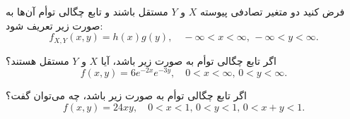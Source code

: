 \problem{}
فرض کنید دو متغیر تصادفی پیوسته $X$ و $Y$ مستقل باشند و تابع چگالی توأم آن‌ها به صورت زیر تعریف شود:
\[
f_{X,Y}(x, y) = h(x)g(y), \quad -\infty < x < \infty, \, -\infty < y < \infty.
\]

اگر تابع چگالی توأم به صورت زیر باشد، آیا $X$ و $Y$ مستقل هستند؟
\[
f(x, y) = 6e^{-2x}e^{-3y}, \quad 0 < x < \infty, \, 0 < y < \infty.
\]

اگر تابع چگالی توأم به صورت زیر باشد، چه می‌توان گفت؟
\[
f(x, y) = 24xy, \quad 0 < x < 1, \, 0 < y < 1, \, 0 < x + y < 1.
\]
